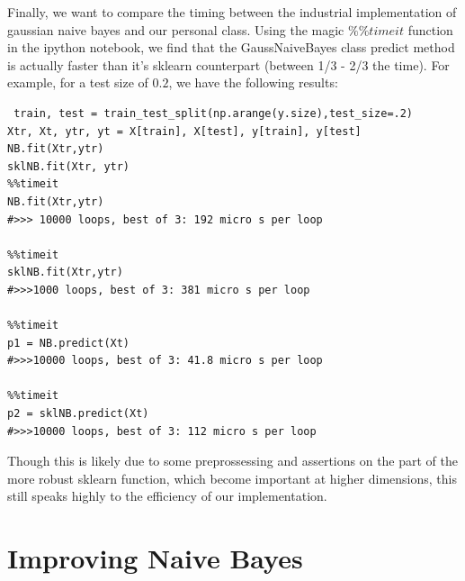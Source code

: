 \documentclass[12pt]{article}
\begin{document}
 Finally, we want to compare the timing between the industrial implementation of gaussian naive bayes and our personal class. 
 Using the magic $\%\% timeit$ function in the ipython notebook, we find that the GaussNaiveBayes class predict method is actually faster than it's sklearn counterpart (between 1/3 - 2/3 the time).
 For example, for a test size of $0.2$, we have the following results:
\begin{lstlisting}
 train, test = train_test_split(np.arange(y.size),test_size=.2)
Xtr, Xt, ytr, yt = X[train], X[test], y[train], y[test]
NB.fit(Xtr,ytr)
sklNB.fit(Xtr, ytr)
%%timeit
NB.fit(Xtr,ytr)
#>>> 10000 loops, best of 3: 192 micro s per loop

%%timeit
sklNB.fit(Xtr,ytr)
#>>>1000 loops, best of 3: 381 micro s per loop

%%timeit
p1 = NB.predict(Xt)
#>>>10000 loops, best of 3: 41.8 micro s per loop

%%timeit
p2 = sklNB.predict(Xt)
#>>>10000 loops, best of 3: 112 micro s per loop
 \end{lstlisting}
 Though this is likely due to some preprossessing and assertions on the part of the more robust sklearn function, which become important at higher dimensions, this still speaks highly to the efficiency of our implementation. 
 
 \section*{Improving Naive Bayes}




\end{document}
